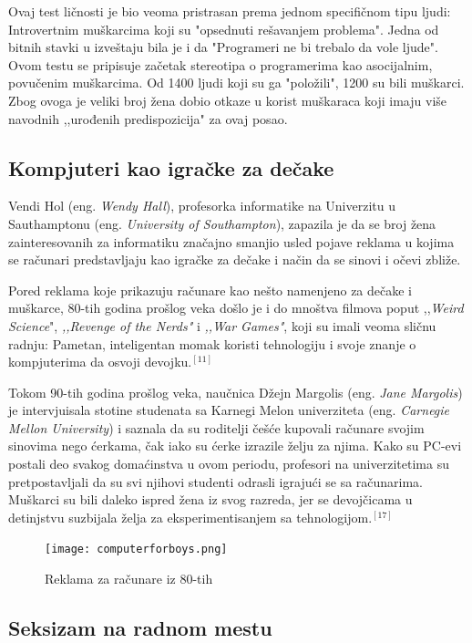 \documentclass[12pt]{article}
\begin{document}
Ovaj test ličnosti je bio veoma pristrasan prema jednom specifičnom tipu ljudi: Introvertnim muškarcima koji su "opsednuti rešavanjem problema". Jedna od bitnih stavki u izveštaju bila je i da "Programeri ne bi trebalo da vole ljude". Ovom testu se pripisuje začetak stereotipa o programerima  kao asocijalnim, povučenim muškarcima. Od 1400 ljudi koji su ga "položili", 1200 su bili muškarci. Zbog ovoga je veliki broj žena dobio otkaze u korist muškaraca koji imaju više navodnih ,,urođenih predispozicija" za ovaj posao.

\subsection{Kompjuteri kao igračke za dečake}

Vendi Hol (eng. \textit{Wendy Hall}), profesorka informatike na Univerzitu u Sauthamptonu (eng. \textit{University of Southampton}), zapazila je da se broj žena zainteresovanih za informatiku značajno smanjio usled pojave reklama u kojima se računari predstavljaju kao igračke za dečake i način da se sinovi i očevi zbliže.

Pored reklama koje prikazuju računare kao nešto namenjeno za dečake i muškarce, 80-tih godina prošlog veka došlo je i do mnoštva filmova poput ,,\textit{Weird Science}", \textit{,,Revenge of the Nerds"} i \textit{,,War Games"}, koji su imali veoma sličnu radnju: Pametan, inteligentan momak koristi tehnologiju i svoje znanje o kompjuterima da osvoji devojku.$^{[11]}$

Tokom 90-tih godina prošlog veka, naučnica Džejn Margolis (eng. \textit{Jane Margolis}) je intervjuisala stotine studenata sa Karnegi Melon univerziteta (eng. \textit{Carnegie Mellon University}) i saznala da su roditelji češće kupovali računare svojim sinovima nego ćerkama, čak iako su ćerke izrazile želju za njima. Kako su PC-evi postali deo svakog domaćinstva u ovom periodu, profesori na univerzitetima su pretpostavljali da su svi njihovi studenti odrasli igrajući se sa računarima. Muškarci su bili daleko ispred žena iz svog razreda, jer se devojčicama u detinjstvu suzbijala želja za eksperimentisanjem sa tehnologijom.$^{[17]}$ 

\begin{figure}[htp]
    \centering
    \texttt{[image: computerforboys.png]}
    \caption{Reklama za računare iz 80-tih}
    \label{fig:enter-label}
\end{figure}

\subsection{Seksizam na radnom mestu}
\end{document}
